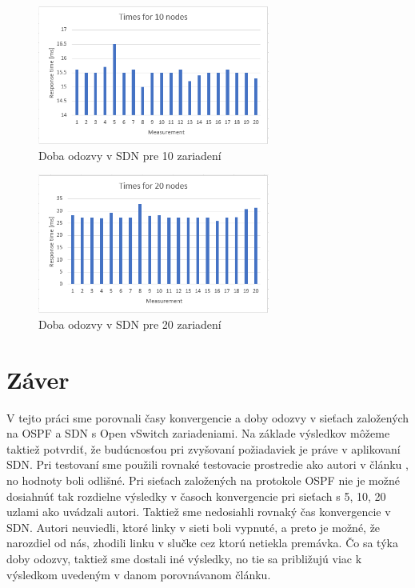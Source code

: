 \documentclass[conference]{IEEEtran}
\begin{document}
\begin{figure}[h!]
\centering
\includegraphics[width=3in]{../img/10responseSDN}
\caption{Doba odozvy v SDN pre 10 zariadení}
\end{figure}

\begin{figure}[h!]
\centering
\includegraphics[width=3in]{../img/20responseSDN}
\caption{Doba odozvy v SDN pre 20 zariadení}
\end{figure}


\section{Záver}

V tejto práci sme porovnali časy konvergencie a doby odozvy v sieťach založených na OSPF a SDN s Open vSwitch zariadeniami. Na základe výsledkov môžeme taktiež potvrdiť, že budúcnosťou pri zvyšovaní požiadaviek je práve v aplikovaní SDN. Pri testovaní sme použili rovnaké testovacie prostredie ako autori v článku \cite{article}, no hodnoty boli odlišné. Pri sieťach založených na protokole OSPF nie je možné dosiahnúť tak rozdielne výsledky v časoch konvergencie pri sieťach s 5, 10, 20 uzlami ako uvádzali autori. Taktiež sme nedosiahli rovnaký čas konvergencie v SDN. Autori neuviedli, ktoré linky v sieti boli vypnuté, a preto je možné, že narozdiel od nás, zhodili linku v slučke cez ktorú netiekla premávka. Čo sa týka doby odozvy, taktiež sme dostali iné výsledky, no tie sa približujú viac k výsledkom uvedeným v danom porovnávanom článku.
\end{document}
